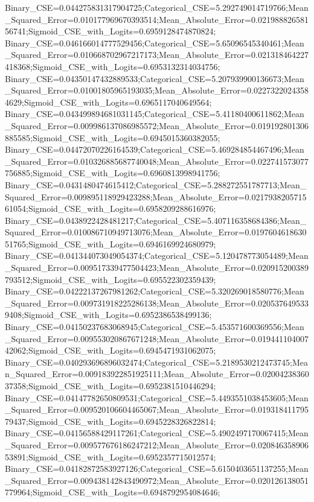 Binary_CSE=0.044275831317904725;Categorical_CSE=5.292749014719766;Mean_Squared_Error=0.010177969670393514;Mean_Absolute_Error=0.02198882658156741;Sigmoid_CSE_with_Logits=0.6959128474870824;
Binary_CSE=0.046166014777529456;Categorical_CSE=5.65096545340461;Mean_Squared_Error=0.010668702967217173;Mean_Absolute_Error=0.021318464227418368;Sigmoid_CSE_with_Logits=0.6953132314034756;
Binary_CSE=0.04350147432889533;Categorical_CSE=5.207939900136673;Mean_Squared_Error=0.01001805965193035;Mean_Absolute_Error=0.02273220243584629;Sigmoid_CSE_with_Logits=0.6965117040649564;
Binary_CSE=0.043499894681031145;Categorical_CSE=5.41180400611862;Mean_Squared_Error=0.009986137086985572;Mean_Absolute_Error=0.019192801306885585;Sigmoid_CSE_with_Logits=0.6945015360382055;
Binary_CSE=0.04472070226164539;Categorical_CSE=5.469284854467496;Mean_Squared_Error=0.010326885687740048;Mean_Absolute_Error=0.022741573077756885;Sigmoid_CSE_with_Logits=0.6960813998941756;
Binary_CSE=0.0431480474615412;Categorical_CSE=5.288272551787713;Mean_Squared_Error=0.009895118929423288;Mean_Absolute_Error=0.021793820571561054;Sigmoid_CSE_with_Logits=0.6958209288616976;
Binary_CSE=0.0438922428481217;Categorical_CSE=5.407116358684386;Mean_Squared_Error=0.010086710949713076;Mean_Absolute_Error=0.019760461863051765;Sigmoid_CSE_with_Logits=0.6946169924680979;
Binary_CSE=0.041344073049054374;Categorical_CSE=5.120478773054489;Mean_Squared_Error=0.009517339477504423;Mean_Absolute_Error=0.020915200389793512;Sigmoid_CSE_with_Logits=0.695522302359439;
Binary_CSE=0.04222137267981262;Categorical_CSE=5.320269018580776;Mean_Squared_Error=0.009731918225286138;Mean_Absolute_Error=0.0205376495339408;Sigmoid_CSE_with_Logits=0.6952386538499136;
Binary_CSE=0.04150237683068945;Categorical_CSE=5.453571600369556;Mean_Squared_Error=0.009553020867671248;Mean_Absolute_Error=0.01944110400742062;Sigmoid_CSE_with_Logits=0.6945471931062075;
Binary_CSE=0.040293696896032474;Categorical_CSE=5.2189530212473745;Mean_Squared_Error=0.009183922851925111;Mean_Absolute_Error=0.0200423836037358;Sigmoid_CSE_with_Logits=0.6952381510446294;
Binary_CSE=0.04147782650809531;Categorical_CSE=5.4493551038453605;Mean_Squared_Error=0.009520106604465067;Mean_Absolute_Error=0.01931841179579437;Sigmoid_CSE_with_Logits=0.6945228326822814;
Binary_CSE=0.04156588429117261;Categorical_CSE=5.4902497170067415;Mean_Squared_Error=0.009577676186247212;Mean_Absolute_Error=0.02084635890653891;Sigmoid_CSE_with_Logits=0.6952357715012574;
Binary_CSE=0.04182872583927126;Categorical_CSE=5.6150403651137255;Mean_Squared_Error=0.009438142843490972;Mean_Absolute_Error=0.020126138051779964;Sigmoid_CSE_with_Logits=0.6948792954084646;
